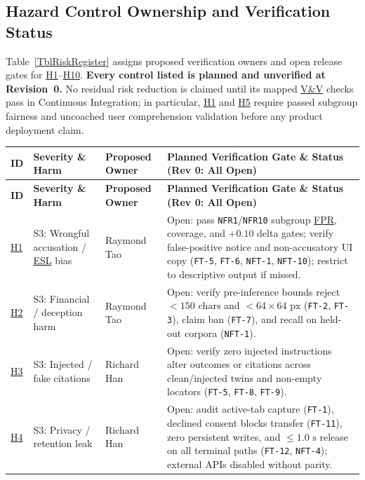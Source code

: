 \documentclass[11pt]{article}
\newcommand{\ESL}{\hyperlink{ha-acr-esl}{ESL}}
\newcommand{\FPR}{\hyperlink{ha-acr-fpr}{FPR}}
\newcommand{\VnV}{\hyperlink{ha-acr-vnv}{V\&V}}
\begin{document}
\subsection{Hazard Control Ownership and Verification Status}
Table~\ref{TblRiskRegister} assigns proposed verification owners and open release gates for \hyperref[haz:H1]{H1}--\hyperref[haz:H10]{H10}. \textbf{Every control listed is planned and unverified at Revision~0.} No residual risk reduction is claimed until its mapped \VnV{} checks pass in Continuous Integration; in particular, \hyperref[haz:H1]{H1} and \hyperref[haz:H5]{H5} require passed subgroup fairness and uncoached user comprehension validation before any product deployment claim.

\begin{tabularx}{\textwidth}{P{1.0cm} P{2.8cm} P{2.4cm} Y}
\caption{Hazard Control Ownership and Open Verification Gates} \label{TblRiskRegister}\label{TblHARiskEval}\\
\toprule
\textbf{ID} & \textbf{Severity \& Harm} & \textbf{Proposed Owner} & \textbf{Planned Verification Gate \& Status (Rev 0: All Open)}\\
\midrule
\endfirsthead
\toprule
\textbf{ID} & \textbf{Severity \& Harm} & \textbf{Proposed Owner} & \textbf{Planned Verification Gate \& Status (Rev 0: All Open)}\\
\midrule
\endhead
\bottomrule
\endfoot
\hyperref[haz:H1]{H1} & S3: Wrongful accusation / \ESL{} bias & Raymond Tao & Open: pass \texttt{NFR1}/\texttt{NFR10} subgroup \FPR{}, coverage, and $+0.10$ delta gates; verify false-positive notice and non-accusatory UI copy (\texttt{FT-5}, \texttt{FT-6}, \texttt{NFT-1}, \texttt{NFT-10}); restrict to descriptive output if missed.\\
\midrule
\hyperref[haz:H2]{H2} & S3: Financial / deception harm & Raymond Tao & Open: verify pre-inference bounds reject $<150\text{ chars}$ and $<64\times64\text{ px}$ (\texttt{FT-2}, \texttt{FT-3}), claim ban (\texttt{FT-7}), and recall on held-out corpora (\texttt{NFT-1}).\\
\midrule
\hyperref[haz:H3]{H3} & S3: Injected / fake citations & Richard Han & Open: verify zero injected instructions alter outcomes or citations across clean/injected twins and non-empty locators (\texttt{FT-5}, \texttt{FT-8}, \texttt{FT-9}).\\
\midrule
\hyperref[haz:H4]{H4} & S3: Privacy / retention leak & Richard Han & Open: audit active-tab capture (\texttt{FT-1}), declined consent blocks transfer (\texttt{FT-11}), zero persistent writes, and $\le 1.0\text{ s}$ release on all terminal paths (\texttt{FT-12}, \texttt{NFT-4}); external APIs disabled without parity.\\

\end{tabularx}
\end{document}
